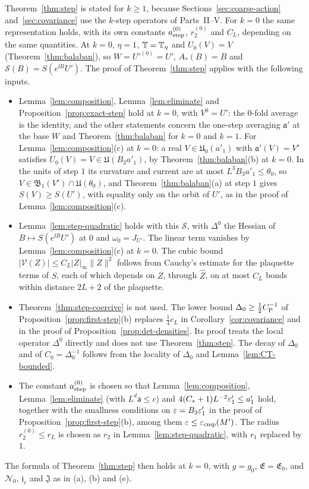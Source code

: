\begin{remark}\label{rem:step-k0}
Theorem~\ref{thm:step} is stated for $k\ge1$, because Sections~\ref{sec:coarse-action} and~\ref{sec:covariance} use the $k$-step operators of Parts~II--V. For $k=0$ the same representation holds, with its own constants $a^{(0)}_{\rm step}$, $r^{(0)}_2$ and $C_L$, depending on the same quantities. At $k=0$, $\eta=1$, $\mathbb T=\mathbb T_\eta$ and $U_0(V)=V$ (Theorem~\ref{thm:balaban}), so $W=U'^{(0)}=U'$, $A_*(B)=B$ and $\mathcal S(B)=S(e^{\ii B}U')$. The proof of Theorem~\ref{thm:step} applies with the following inputs.
\begin{itemize}
\item Lemma~\ref{lem:composition}, Lemma~\ref{lem:eliminate} and Proposition~\ref{prop:exact-step} hold at $k=0$, with $V^0=U'$: the $0$-fold average is the identity, and the other statements concern the one-step averaging $\mathfrak a'$ at the base $W$ and Theorem~\ref{thm:balaban} for $k=0$ and $k=1$. For Lemma~\ref{lem:composition}(c) at $k=0$: a real $V\in\mathfrak U_0(a'_1)$ with $\mathfrak a'(V)=V'$ satisfies $U_0(V)=V\in\mathfrak U(B_3a'_1)$, by Theorem~\ref{thm:balaban}(b) at $k=0$. In the units of step $1$ its curvature and current are at most $L^3B_3a'_1\le\theta_0$, so $V\in\mathfrak B_1(V')\cap\mathfrak U(\theta_0)$, and Theorem~\ref{thm:balaban}(a) at step $1$ gives $S(V)\ge S(U')$, with equality only on the orbit of $U'$, as in the proof of Lemma~\ref{lem:composition}(c).
\item Lemma~\ref{lem:step-quadratic} holds with this $\mathcal S$, with $\Delta^0$ the Hessian of $B\mapsto S(e^{\ii B}U')$ at $0$ and $\omega_0=J_{U'}$. The linear term vanishes by Lemma~\ref{lem:composition}(c) at $k=0$. The cubic bound $|\mathcal V(Z)|\le C_L|Z|_\infty\|Z\|^2$ follows from Cauchy's estimate for the plaquette terms of $S$, each of which depends on $Z$, through $\hat Z$, on at most $C_L$ bonds within distance $2L+2$ of the plaquette.
\item Theorem~\ref{thm:step-coercive} is not used. The lower bound $\Delta_0\ge\frac12C_{\rm P}^{-1}$ of Proposition~\ref{prop:first-step}(b) replaces $\frac14c_L$ in Corollary~\ref{cor:covariance} and in the proof of Proposition~\ref{prop:det-densities}. Its proof treats the local operator $\Delta^0$ directly and does not use Theorem~\ref{thm:step}. The decay of $\Delta_0$ and of $C_0=\Delta_0^{-1}$ follows from the locality of $\Delta_0$ and Lemma~\ref{lem:CT-bounded}.
\item The constant $a^{(0)}_{\rm step}$ is chosen so that Lemma~\ref{lem:composition}, Lemma~\ref{lem:eliminate} (with $L^d\mathsf a\le c$) and $4(C_*+1)L^{-2}\varepsilon'_1\le a'_1$ hold, together with the smallness conditions on $\varepsilon=B_3\varepsilon'_1$ in the proof of Proposition~\ref{prop:first-step}(b), among them $\varepsilon\le\varepsilon_{\rm cmp}(M')$. The radius $r^{(0)}_2\le r_L$ is chosen as $r_2$ in Lemma~\ref{lem:step-quadratic}, with $r_1$ replaced by $1$.
\end{itemize}
The formula of Theorem~\ref{thm:step} then holds at $k=0$, with $g=g_0$, $\mathfrak E=\mathfrak E_0$, and $\mathcal N_0$, $\mathfrak j_c$ and $\mathfrak J$ as in (a), (b) and (e).
\end{remark}

